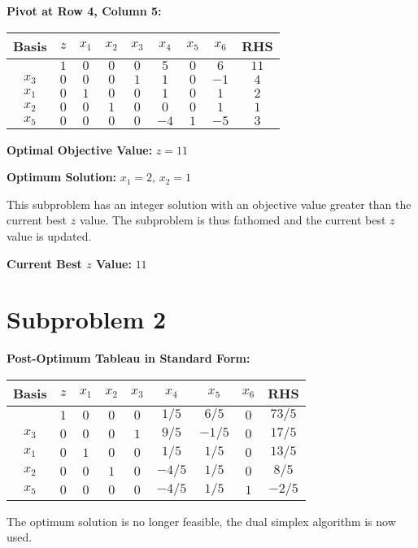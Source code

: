 \documentclass{article}[12pt,a4paper]
\begin{document}
\begin{enumerate}
  	  \noindent \textbf{Pivot at Row 4, Column 5:}
  	  \begin{center}
 	   \begin{tabular}{c | c | c c c c c c | c}
            		Basis & $z$ & $x_1$ & $x_2$ & $x_3$ & $x_4$ & $x_5$ & $x_6$ & RHS \\ \hline
  			           & $1$ & $0$ & $0$   & $0$ & $5$     & $0$ & $6$ & $11$  \\ \hline
  			$x_3$ & $0$ & $0$ & $0$   & $1$    & $1$  & $0$ & $-1$ & $4$ \\
  			$x_1$ & $0$ & $1$ & $0$  &  $0$    & $1$  & $0$ & $1$ & $2$ \\
  			$x_2$ & $0$ & $0$ & $1$ &   $0$    & $0$ & $0$ & $1$ & $1$ \\
  			$x_5$ & $0$ & $0$ & $0$ &   $0$    & $-4$ & $1$ & $-5$ & $3$ \\
  	  \end{tabular}
  	  \end{center}
  	   \textbf{Optimal Objective Value:} $z = 11$
  	  
  	  \noindent \textbf{Optimum Solution:} $x_1 = 2$, $x_2 = 1$
  	  
  	  \noindent This subproblem has an integer solution with an objective value greater than the current best $z$ value.
  	  The subproblem is thus fathomed and the current best $z$ value is updated.
  	  
  	  \textbf{Current Best $z$ Value:} $11$
  	  
  	  \pagebreak
  	  
  	  \noindent \section*{Subproblem 2}
  	  \textbf{Post-Optimum Tableau in Standard Form:}
  	  \begin{center}
 	   \begin{tabular}{c | c | c c c c c c | c}
            		Basis & $z$ & $x_1$ & $x_2$ & $x_3$ & $x_4$ & $x_5$ & $x_6$ & RHS \\ \hline
  			           & $1$ & $0$ & $0$   & $0$ & $1/5$     & $6/5$ & $0$ & $73/5$  \\ \hline
  			$x_3$ & $0$ & $0$ & $0$   & $1$    & $9/5$  & $-1/5$ & $0$ & $17/5$ \\
  			$x_1$ & $0$ & $1$ & $0$  &  $0$    & $1/5$  & $1/5$ & $0$ & $13/5$ \\
  			$x_2$ & $0$ & $0$ & $1$ &   $0$    & $-4/5$ & $1/5$ & $0$ & $8/5$ \\
  			$x_5$ & $0$ & $0$ & $0$ &   $0$    & $-4/5$ & $1/5$ & $1$ & $-2/5$ \\
  	  \end{tabular}
  	  \end{center}
  	  The optimum solution is no longer feasible, the dual simplex algorithm is now used. 
  	  

\end{enumerate}
\end{document}
